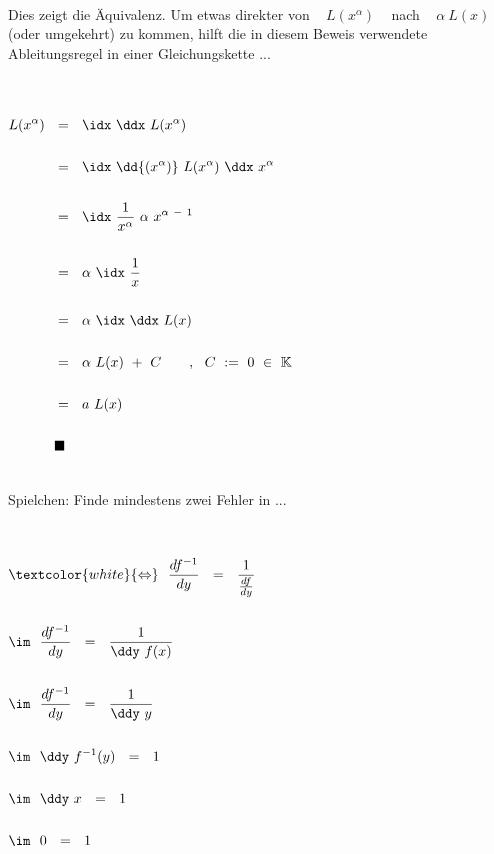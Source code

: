\begin{description}[leftmargin=*, labelsep=3em, itemsep=3em]
	~\\
	
	Dies zeigt die Äquivalenz. Um etwas direkter von ~ $L(x^{\alpha})$ ~ nach ~ $\alpha ~ L(x)$ ~ (oder umgekehrt) zu kommen, hilft die in diesem Beweis verwendete Ableitungsregel in einer Gleichungskette ...
	
	~\\
	~\\
	
	$\begin{aligned}[t]
	L(x^{\alpha}) ~~ &= ~~ \idx ~ \ddx ~ L(x^{\alpha}) \\ \\
	&= ~~ \idx ~ \dd{(x^{\alpha})} ~ L(x^{\alpha}) ~ \ddx ~ x^{\alpha} \\ \\
	&= ~~ \idx ~ \frac{1}{x^{\alpha}} ~ \alpha ~ x^{\alpha ~ - ~ 1} \\ \\
	&= ~~ \alpha ~ \idx ~ \frac{1}{x} \\ \\
	&= ~~ \alpha ~ \idx ~ \ddx ~ L(x) \\ \\
	&= ~~ \alpha ~ L(x) ~ + ~ C \qquad, ~~ C ~ := ~ 0 ~ \in ~ \mathbb{K} \\ \\
	&= ~~ a ~ L(x) \\ \\
	&\blacksquare
	\end{aligned}$ \\
	
	
	\newpage
	
	
	\item[\textnormal{c) \quad iii)}] \hfill
	
	~\\
	
	Spielchen: \qquad Finde mindestens zwei Fehler in ...
	
	~\\
	
	\setcounter{tc}{0}
	
	$\begin{aligned}[t]
	&\textcolor{white}{\Leftrightarrow} ~~ \frac{df^{-1}}{dy} ~~ = ~~ \frac{1}{\frac{df}{dy}} \\ \\
	&\im ~~ \frac{df^{-1}}{dy} ~~ = ~~ \frac{1}{\ddy ~ f(x)} \\ \\
	&\im ~~ \frac{df^{-1}}{dy} ~~ = ~~ \frac{1}{\ddy ~ y} \\ \\
	&\im ~~ \ddy ~ f^{-1}(y) ~~ = ~~ 1 \\ \\
	&\im ~~ \ddy ~ x ~~ = ~~ 1 \\ \\
	&\im ~~ 0 ~~ = ~~ 1
	\end{aligned}$ \\
	

\end{description}
